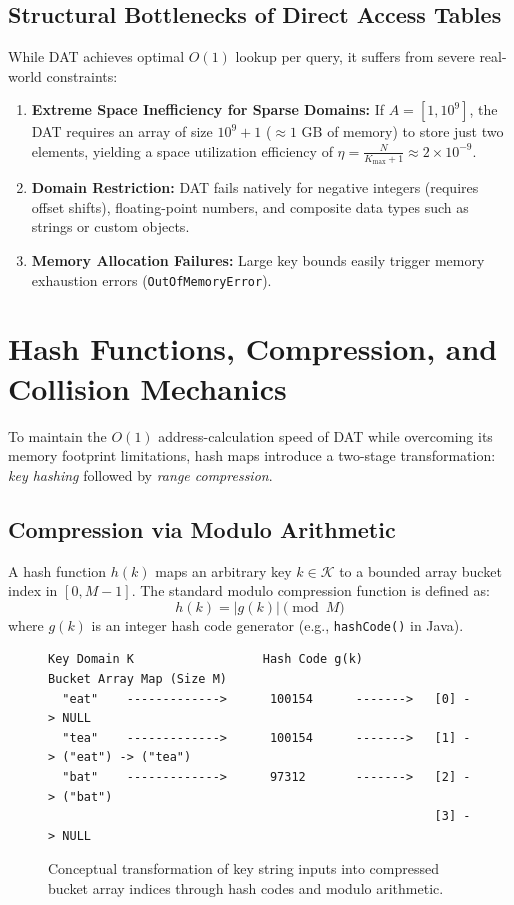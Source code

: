 \documentclass[10pt,journal,compsoc,onecolumn]{IEEEtran}
\begin{document}
\subsection{Structural Bottlenecks of Direct Access Tables}
While DAT achieves optimal $O(1)$ lookup per query, it suffers from severe real-world constraints:
\begin{enumerate}
    \item \textbf{Extreme Space Inefficiency for Sparse Domains:} If $A = [1, 10^9]$, the DAT requires an array of size $10^9 + 1$ ($\approx 1\text{ GB}$ of memory) to store just two elements, yielding a space utilization efficiency of $\eta = \frac{N}{K_{\max} + 1} \approx 2 \times 10^{-9}$.
    \item \textbf{Domain Restriction:} DAT fails natively for negative integers (requires offset shifts), floating-point numbers, and composite data types such as strings or custom objects.
    \item \textbf{Memory Allocation Failures:} Large key bounds easily trigger memory exhaustion errors (\texttt{OutOfMemoryError}).
\end{enumerate}

\section{Hash Functions, Compression, and Collision Mechanics}
\label{sec:hash-functions}

To maintain the $O(1)$ address-calculation speed of DAT while overcoming its memory footprint limitations, hash maps introduce a two-stage transformation: \emph{key hashing} followed by \emph{range compression}.

\subsection{Compression via Modulo Arithmetic}
A hash function $h(k)$ maps an arbitrary key $k \in \mathcal{K}$ to a bounded array bucket index in $[0, M-1]$. The standard modulo compression function is defined as:
\[
h(k) = |g(k)| \pmod M
\]
where $g(k)$ is an integer hash code generator (e.g., \texttt{hashCode()} in Java).

\begin{figure}[htbp]
\centering
\begin{verbatim}
Key Domain K                  Hash Code g(k)          Bucket Array Map (Size M)
  "eat"    ------------->      100154      ------->   [0] -> NULL
  "tea"    ------------->      100154      ------->   [1] -> ("eat") -> ("tea")
  "bat"    ------------->      97312       ------->   [2] -> ("bat")
                                                      [3] -> NULL
\end{verbatim}
\caption{Conceptual transformation of key string inputs into compressed bucket array indices through hash codes and modulo arithmetic.}
\label{fig:hash-pipeline}
\end{figure}
\end{document}
